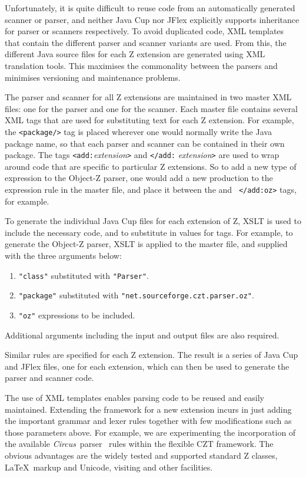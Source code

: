 \documentclass{llncs}
\newcommand{\Circus}{{\sf\slshape Circus}}
\begin{document}
  Unfortunately, it is quite difficult to reuse code from an
  automatically generated scanner or parser, and neither Java Cup nor
  JFlex explicitly supports inheritance for parser or scanners
  respectively.  To avoid duplicated code, XML templates that contain
  the different parser and scanner variants are used. From this, the
  different Java source files for each Z extension are generated using
  XML translation tools.  This maximises the commonality between the
  parsers and minimises versioning and maintenance problems.

The parser and scanner for all Z extensions are maintained in two
master XML files: one for the parser and one for the scanner. Each
master file contains several XML tags that are used for substituting
text for each Z extension. For example, the {\tt <package/>} tag is
placed wherever one would normally write the Java package name, so
that each parser and scanner can be contained in their own
package. The tags {\tt <add:}{\em extension}{\tt >} and {\tt </add:}{\em
extension}{\tt >} are used to wrap around code that are specific to
particular Z extensions. So to add a new type of expression to the
Object-Z parser, one would add a new production to the expression rule
in the master file, and place it between the {\tt <add:oz>} and {\tt
</add:oz>} tags, for example.

To generate the individual Java Cup files for each extension of Z,
XSLT is used to include the necessary code, and to substitute in
values for tags. For example, to generate the Object-Z parser, XSLT is
applied to the master file, and supplied with the three arguments
below:
\begin{enumerate}
  \item {\tt "class"} substituted with {\tt "Parser"}.
  \item {\tt "package"} substituted with {\tt "net.sourceforge.czt.parser.oz"}.
  \item {\tt "oz"} expressions to be included.
\end{enumerate}

Additional arguments including the input and output files are also
required.

Similar rules are specified for each Z extension. The result is a series
of Java Cup and JFlex files, one for each extension, which can then be
used to generate the parser and scanner code.

The use of XML templates enables parsing code to be reused and easily maintained.
Extending the framework for a new extension incurs in just adding the important
grammar and lexer rules together with few modifications such as those parameters above.
For example, we are experimenting the incorporation of the available \Circus\
parser~\cite{circus.other:parser} rules within the flexible CZT framework. The
obvious advantages are the widely tested and supported standard Z classes, \LaTeX\
markup and Unicode, visiting and other facilities.
\end{document}
